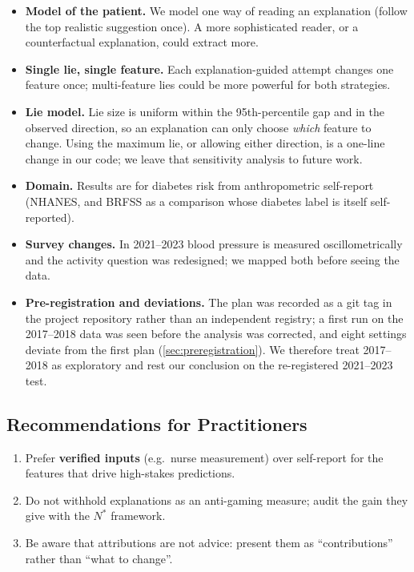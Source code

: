 \documentclass[sigconf,nonacm]{acmart}
\begin{document}
\begin{itemize}
  \item \textbf{Model of the patient.} We model one way of reading an
        explanation (follow the top realistic suggestion once).  A
        more sophisticated reader, or a counterfactual explanation,
        could extract more.
  \item \textbf{Single lie, single feature.} Each explanation-guided
        attempt changes one feature once; multi-feature lies could be
        more powerful for both strategies.
  \item \textbf{Lie model.} Lie size is uniform within the
        95th-percentile gap and in the observed direction, so an
        explanation can only choose \emph{which} feature to change.
        Using the maximum lie, or allowing either direction, is a
        one-line change in our code; we leave that sensitivity analysis
        to future work.
  \item \textbf{Domain.} Results are for diabetes risk from
        anthropometric self-report (NHANES, and BRFSS as a comparison
        whose diabetes label is itself self-reported).
  \item \textbf{Survey changes.} In 2021--2023 blood pressure is
        measured oscillometrically and the activity question was
        redesigned; we mapped both before seeing the data.
  \item \textbf{Pre-registration and deviations.} The plan was
        recorded as a git tag in the project repository rather than an
        independent registry; a first run on the 2017--2018 data was
        seen before the analysis was corrected, and eight settings
        deviate from the first plan (\cref{sec:preregistration}).  We
        therefore treat 2017--2018 as exploratory and rest our
        conclusion on the re-registered 2021--2023 test.
\end{itemize}

\subsection{Recommendations for Practitioners}

\begin{enumerate}
  \item Prefer \textbf{verified inputs} (e.g.\ nurse measurement) over
        self-report for the features that drive high-stakes predictions.
  \item Do not withhold explanations as an anti-gaming measure; audit
        the gain they give with the $N^*$ framework.
  \item Be aware that attributions are not advice: present them as
        ``contributions'' rather than ``what to change''.
\end{enumerate}
\end{document}
